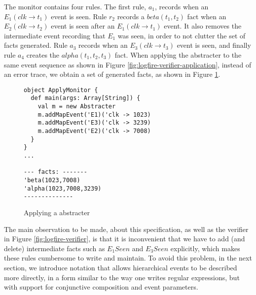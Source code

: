The monitor contains four rules. The first rule, $a_1$, records when an $E_1(clk \rightarrow t_1)$
event is seen. Rule $r_2$ records a $beta(t_1,t_2)$ fact when an 
$E_2(clk \rightarrow t_2)$ event is seen after an $E_1(clk \rightarrow t_1)$ event. It also removes the intermediate
event recording that $E_1$ was seen, in order to not clutter the set of facts generated. Rule $a_3$ records when an $E_3(clk \rightarrow t_3)$ 
event is seen, and finally rule $a_4$ creates the $alpha(t_1,t_2,t_3)$ fact.
When applying the abstracter to the same event sequence as shown in 
Figure \ref{fig:logfire-verifier-application}, instead of an error trace, we obtain
a set of generated facts, as shown in Figure \ref{fig:logfire-abstracter-application}.

\begin{figure}[htb]
\begin{small}
\begin{framed}
\sscala
\begin{lstlisting}
object ApplyMonitor {
  def main(args: Array[String]) {
    val m = new Abstracter
    m.addMapEvent('E1)('clk -> 1023)
    m.addMapEvent('E3)('clk -> 3239)
    m.addMapEvent('E2)('clk -> 7008)
  }
}
...

--- facts: -------
'beta(1023,7008)
'alpha(1023,7008,3239)
--------------
\end{lstlisting}
\end{framed}
\end{small}
\caption{Applying a \logfire{} abstracter}
\label{fig:logfire-abstracter-application}
\end{figure}

The main observation to be made, about this specification, as well as
the verifier in Figure \ref{fig:logfire-verifier}, is that it is
inconvenient that we have to add (and delete) intermediate facts such as
$E_1Seen$ and $E_3Seen$ explicitly, which makes these rules cumbersome
to write and maintain.  To avoid this problem, in the next section, we
introduce notation that allows hierarchical events to be described
more directly, in a form similar to the way one writes regular
expressions, but with support for conjunctive composition and event parameters.

